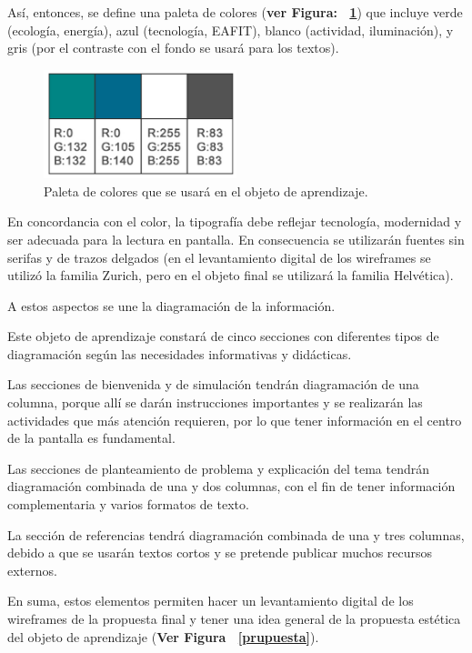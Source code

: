 \documentclass[twoside,letterpaper,11pt]{report}
\begin{document}
Así, entonces, se define una paleta de colores (\textbf{ver Figura: ~\ref{paleta}}) que incluye verde (ecología, energía), azul (tecnología, EAFIT), blanco (actividad, iluminación), y gris (por el contraste con el fondo se usará para los textos).

\begin{figure}[h!]
\label{paleta}
\centering
\includegraphics[width=0.5\textwidth]{aux/paletaColores}
\caption{Paleta de colores que se usará en el objeto de aprendizaje.}
\end{figure}

En concordancia con el color, la tipografía debe reflejar tecnología, modernidad y ser adecuada para la lectura en pantalla. En consecuencia se utilizarán fuentes sin serifas y de trazos delgados (en el levantamiento digital de los wireframes se utilizó la familia Zurich, pero en el objeto final se utilizará la familia Helvética).

A estos aspectos se une la diagramación de la información.

Este objeto de aprendizaje constará de cinco secciones con diferentes tipos de diagramación según las necesidades informativas y didácticas.

Las secciones de bienvenida y de simulación tendrán diagramación de una columna, porque allí se darán instrucciones importantes y se realizarán las actividades que más atención requieren, por lo que tener información en el centro de la pantalla es fundamental.

Las secciones de planteamiento de problema y explicación del tema tendrán diagramación combinada de una y dos columnas, con el fin de tener información complementaria y varios formatos de texto.

La sección de referencias tendrá diagramación combinada de una y tres columnas, debido a que se usarán textos cortos y se pretende publicar muchos recursos externos.

En suma, estos elementos permiten hacer un levantamiento digital de los wireframes de la propuesta final y tener una idea general de la propuesta estética del objeto de aprendizaje (\textbf{Ver Figura ~\ref{prupuesta}}).
\end{document}
